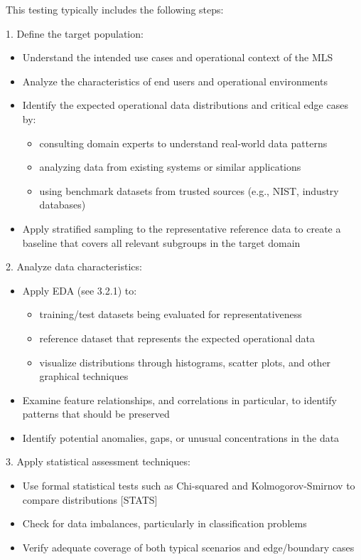 \documentclass[
  letterpaper,
  DIV=11,
  numbers=noendperiod,
  oneside]{scrreprt}
\begin{document}
\begin{tcolorbox}
This testing typically includes the following steps:

1. Define the target population:

\begin{itemize}
\item
  Understand the intended use cases and operational context of the MLS
\item
  Analyze the characteristics of end users and operational environments
\item
  Identify the expected operational data distributions and critical edge
  cases by:

  \begin{itemize}
  \item
    consulting domain experts to understand real-world data patterns
  \item
    analyzing data from existing systems or similar applications
  \item
    using benchmark datasets from trusted sources (e.g., NIST, industry
    databases)
  \end{itemize}
\item
  Apply stratified sampling to the representative reference data to
  create a baseline that covers all relevant subgroups in the target
  domain
\end{itemize}

2. Analyze data characteristics:

\begin{itemize}
\item
  Apply EDA (see 3.2.1) to:

  \begin{itemize}
  \item
    training/test datasets being evaluated for representativeness
  \item
    reference dataset that represents the expected operational data
  \item
    visualize distributions through histograms, scatter plots, and other
    graphical techniques
  \end{itemize}
\item
  Examine feature relationships, and correlations in particular, to
  identify patterns that should be preserved
\item
  Identify potential anomalies, gaps, or unusual concentrations in the
  data
\end{itemize}

3. Apply statistical assessment techniques:

\begin{itemize}
\item
  Use formal statistical tests such as Chi-squared and
  Kolmogorov-Smirnov to compare distributions {[}STATS{]}
\item
  Check for data imbalances, particularly in classification problems
\item
  Verify adequate coverage of both typical scenarios and edge/boundary
  cases
\end{itemize}


\end{tcolorbox}
\end{document}
